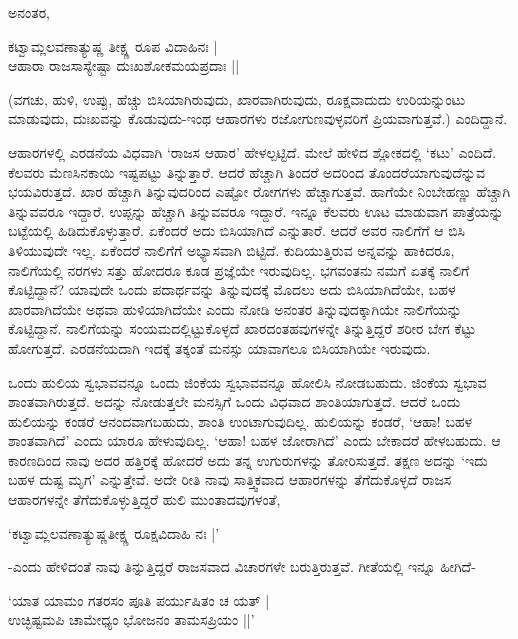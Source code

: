 ಅನಂತರ,

\begin{shloka}
ಕಟ್ವಾಮ್ಲಲವಣಾತ್ಯುಷ್ಣ ತೀಕ್ಷ್ಣ ರೂಪ ವಿದಾಹಿನಃ |\\
ಆಹಾರಾ ರಾಜಸಾಸ್ಯೇಷ್ಟಾ ದುಃಖಶೋಕಮಯಪ್ರದಾಃ ||
\end{shloka}

(ವಗಚು, ಹುಳಿ, ಉಪ್ಪು, ಹೆಚ್ಚು ಬಿಸಿಯಾಗಿರುವುದು, ಖಾರವಾಗಿರುವುದು, ರೂಕ್ಷವಾದುದು ಉರಿಯನ್ನುಂಟು ಮಾಡುವುದು, ದುಃಖವನ್ನು ಕೊಡುವುದು-ಇಂಥ ಆಹಾರಗಳು ರಜೋಗುಣವುಳ್ಳವರಿಗೆ ಪ್ರಿಯವಾಗುತ್ತವೆ.) ಎಂದಿದ್ದಾನೆ.

ಆಹಾರಗಳಲ್ಲಿ ಎರಡನೆಯ ವಿಧವಾಗಿ `ರಾಜಸ ಆಹಾರ' ಹೇಳಲ್ಪಟ್ಟಿದೆ. ಮೇಲೆ ಹೇಳಿದ ಶ್ಲೋಕದಲ್ಲಿ `ಕಟು' ಎಂದಿದೆ. ಕೆಲವರು ಮೆಣಸಿನಕಾಯಿ ಇಷ್ಟಪಟ್ಟು ತಿನ್ನುತ್ತಾರೆ. ಆದರೆ ಹೆಚ್ಚಾಗಿ ತಿಂದರೆ ಅದರಿಂದ ತೊಂದರೆಯಾಗುವುದೆನ್ನುವ ಭಯವಿರುತ್ತದೆ. ಖಾರ ಹೆಚ್ಚಾಗಿ ತಿನ್ನುವುದರಿಂದ ಎಷ್ಟೋ ರೋಗಗಳು ಹೆಚ್ಚಾಗುತ್ತವೆ. ಹಾಗೆಯೇ ನಿಂಬೇಹಣ್ಣು ಹೆಚ್ಚಾಗಿ ತಿನ್ನುವವರೂ ಇದ್ದಾರೆ. ಉಪ್ಪನ್ನು ಹೆಚ್ಚಾಗಿ ತಿನ್ನುವವರೂ ಇದ್ದಾರೆ. ಇನ್ನೂ ಕೆಲವರು ಊಟ ಮಾಡುವಾಗ ಪಾತ್ರೆಯನ್ನು ಬಟ್ಟೆಯಲ್ಲಿ ಹಿಡಿದುಕೊಳ್ಳುತ್ತಾರೆ. ಏಕೆಂದರೆ ಅದು ಬಿಸಿಯಾಗಿದೆ ಎನ್ನುತಾರೆ. ಆದರೆ ಅವರ ನಾಲಿಗೆಗೆ ಆ ಬಿಸಿ ತಿಳಿಯುವುದೇ ಇಲ್ಲ. ಏಕೆಂದರೆ ನಾಲಿಗೆಗೆ ಅಭ್ಯಾಸವಾಗಿ ಬಿಟ್ಟಿದೆ. ಕುದಿಯುತ್ತಿರುವ ಅನ್ನವನ್ನು ಹಾಕಿದರೂ, ನಾಲಿಗೆಯಲ್ಲಿ ನರಗಳು ಸತ್ತು ಹೋದರೂ ಕೂಡ ಪ್ರಜ್ಞೆಯೇ ಇರುವುದಿಲ್ಲ. ಭಗವಂತನು ನಮಗೆ ಏತಕ್ಕೆ ನಾಲಿಗೆ ಕೊಟ್ಟಿದ್ದಾನೆ? ಯಾವುದೇ ಒಂದು ಪದಾರ್ಥವನ್ನು ತಿನ್ನುವುದಕ್ಕೆ ಮೊದಲು ಅದು ಬಿಸಿಯಾಗಿದೆಯೇ, ಬಹಳ ಖಾರವಾಗಿದೆಯೇ ಅಥವಾ ಹುಳಿಯಾಗಿದೆಯೇ ಎಂದು ನೋಡಿ ಅನಂತರ ತಿನ್ನುವುದಕ್ಕಾಗಿಯೇ ನಾಲಿಗೆಯನ್ನು ಕೊಟ್ಟಿದ್ದಾನೆ. ನಾಲಿಗೆಯನ್ನು ಸಂಯಮದಲ್ಲಿಟ್ಟುಕೊಳ್ಳದೆ ಖಾರದಂತಹವುಗಳನ್ನೇ ತಿನ್ನುತ್ತಿದ್ದರೆ ಶರೀರ ಬೇಗ ಕೆಟ್ಟು ಹೋಗುತ್ತದೆ. ಎರಡನೆಯದಾಗಿ ಇದಕ್ಕೆ ತಕ್ಕಂತೆ ಮನಸ್ಸು ಯಾವಾಗಲೂ ಬಿಸಿಯಾಗಿಯೇ ಇರುವುದು.

ಒಂದು ಹುಲಿಯ ಸ್ವಭಾವವನ್ನೂ ಒಂದು ಜಿಂಕೆಯ ಸ್ವಭಾವವನ್ನೂ ಹೋಲಿಸಿ ನೋಡಬಹುದು. ಜಿಂಕೆಯ ಸ್ವಭಾವ ಶಾಂತವಾಗಿರುತ್ತದೆ. ಅದನ್ನು ನೋಡುತ್ತಲೇ ಮನಸ್ಸಿಗೆ ಒಂದು ವಿಧವಾದ ಶಾಂತಿಯಾಗುತ್ತದೆ. ಆದರೆ ಒಂದು ಹುಲಿಯನ್ನು ಕಂಡರೆ ಆನಂದವಾಗಬಹುದು, ಶಾಂತಿ ಉಂಟಾಗುವುದಿಲ್ಲ. ಹುಲಿಯನ್ನು ಕಂಡರೆ, `ಆಹಾ! ಬಹಳ ಶಾಂತವಾಗಿದೆ' ಎಂದು ಯಾರೂ ಹೇಳುವುದಿಲ್ಲ. `ಆಹಾ! ಬಹಳ ಜೋರಾಗಿದೆ' ಎಂದು ಬೇಕಾದರೆ ಹೇಳಬಹುದು. ಆ ಕಾರಣದಿಂದ ನಾವು ಅದರ ಹತ್ತಿರಕ್ಕೆ ಹೋದರೆ ಅದು ತನ್ನ ಉಗುರುಗಳನ್ನು ತೋರಿಸುತ್ತದೆ. ತಕ್ಷಣ ಅದನ್ನು `ಇದು ಬಹಳ ದುಷ್ಟ ಮೃಗ' ಎನ್ನುತ್ತೇವೆ. ಅದೇ ರೀತಿ ನಾವು ಸಾತ್ತ್ವಿಕವಾದ ಆಹಾರಗಳನ್ನು ತೆಗೆದುಕೊಳ್ಳದೆ ರಾಜಸ ಆಹಾರಗಳನ್ನೇ ತೆಗೆದುಕೊಳ್ಳುತ್ತಿದ್ದರೆ ಹುಲಿ ಮುಂತಾದವುಗಳಂತೆ,


\begin{shloka}
`ಕಟ್ವಾಮ್ಲಲವಣಾತ್ಯುಷ್ಣತೀಕ್ಷ್ಣ ರೂಕ್ಷವಿದಾಹಿ ನಃ |'
\end{shloka}

-ಎಂದು ಹೇಳಿದಂತೆ ನಾವು ತಿನ್ನುತ್ತಿದ್ದರೆ ರಾಜಸವಾದ ವಿಚಾರಗಳೇ ಬರುತ್ತಿರುತ್ತವೆ. ಗೀತೆಯಲ್ಲಿ ಇನ್ನೂ ಹೀಗಿದೆ-

\begin{shloka}
`ಯಾತ ಯಾಮಂ ಗತರಸಂ ಪೂತಿ ಪರ್ಯುಷಿತಂ ಚ ಯತ್ |\\
ಉಚ್ಛಿಷ್ಟಮಪಿ ಚಾಮೇಧ್ಯಂ ಭೋಜನಂ ತಾಮಸಪ್ರಿಯಂ ||'
\end{shloka}

